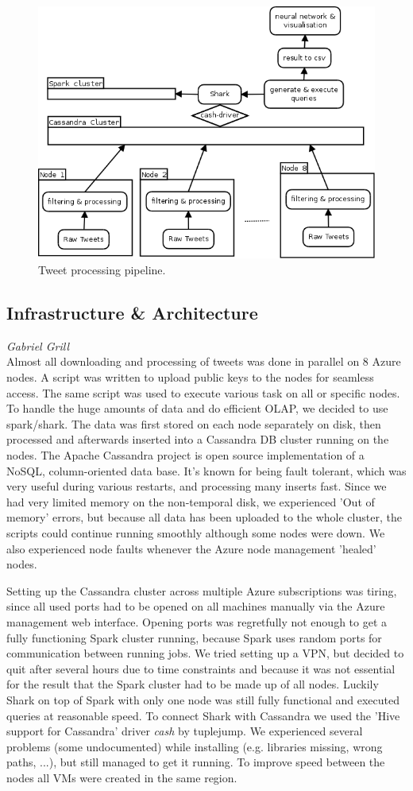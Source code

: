 \begin{figure}
\includegraphics[width=.7\textwidth]{./img/architecture.png}
\caption{Tweet processing pipeline.}
\label{fig:architecture}
\end{figure}

\subsection*{Infrastructure \& Architecture}
\emph{Gabriel Grill} \\
Almost all downloading and processing of tweets was done in parallel on 8 Azure nodes. A script was written to upload public keys to the nodes for seamless access. The same script was used to execute various task on all or specific nodes. To handle the huge amounts of data and do efficient OLAP, we decided to use spark/shark. The data was first stored on each node separately on disk, then processed and afterwards inserted into a Cassandra DB cluster running on the nodes. The Apache Cassandra project is open source implementation of a NoSQL, column-oriented data base. It's known for being fault tolerant, which was very useful during various restarts, and processing many inserts fast. Since we had very limited memory on the non-temporal disk, we experienced 'Out of memory' errors, but because all data has been uploaded to the whole cluster, the scripts could continue running smoothly although some nodes were down. We also experienced node faults whenever the Azure node management 'healed' nodes.

Setting up the Cassandra cluster across multiple Azure subscriptions was tiring, since all used ports had to be opened on all machines manually via the Azure management web interface. Opening ports was regretfully not enough to get a fully functioning Spark cluster running, because Spark uses random ports for communication between running jobs. We tried setting up a VPN, but decided to quit after several hours due to time constraints and because it was not essential for the result that the Spark cluster had to be made up of all nodes. Luckily Shark on top of Spark with only one node was still fully functional and executed queries at reasonable speed. To connect Shark with Cassandra we used the 'Hive support for Cassandra' driver \emph{cash} by tuplejump. We experienced several problems (some undocumented) while installing (e.g. libraries missing, wrong paths, ...), but still managed to get it running. To improve speed between the nodes all VMs were created in the same region.
